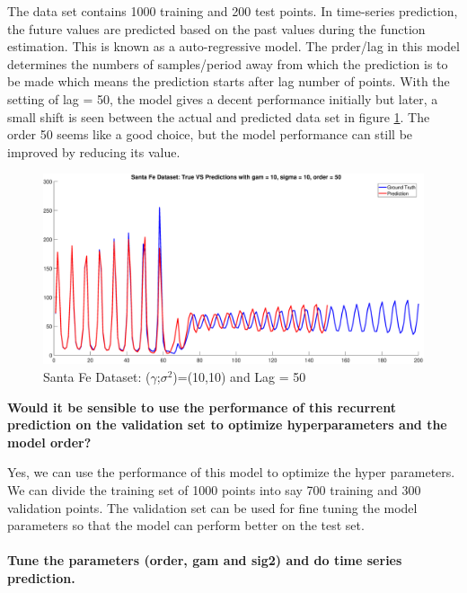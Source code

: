 The data set contains 1000 training and 200 test points. In time-series prediction, the future values are predicted based on the past values during the function estimation. This is known as a auto-regressive model. The prder/lag in this model determines the numbers of samples/period away from which the prediction is to be made which means the prediction starts after lag number of points. With the setting of lag = 50, the model gives a decent performance initially but later, a small shift is seen between the actual and predicted data set in figure \ref{fig:sfe1}. The order 50 seems like a good choice, but the model performance can still be improved by reducing its value. \\
\begin{figure}
	\begin{center}
		\includegraphics[height=0.5\linewidth,width= 1\linewidth]{Exercise2/Report/sfe1} 
		\caption{Santa Fe Dataset: ($\gamma$;$\sigma^2$)=(10,10) and Lag = 50}
		\label{fig:sfe1}
	\end{center}
\end{figure}
 
 \textbf{Would it be sensible to use the performance of this recurrent prediction on the validation set to optimize hyperparameters and the model order?}
 
 Yes, we can use the performance of this model to optimize the hyper parameters. We can divide the training set of 1000 points into say 700 training and 300 validation points. The validation set can be used for fine tuning the model parameters so that the model can perform better on the test set.\\\\
 \textbf{Tune the parameters (order, gam and sig2) and do time series prediction.}

